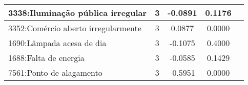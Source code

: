 \begin{table}[htbp]
\begin{tabular}{|l|c|c|c|c|}
		\hline
		3338:Iluminação pública irregular       & 3                & -0.0891        & 0.1176           \\
		\hline
		3352:Comércio aberto irregularmente     & 3                & 0.0877         & 0.0000           \\
		\hline
		1690:Lâmpada acesa de dia               & 3                & -0.1075        & 0.4000           \\
		\hline
		1688:Falta de energia                   & 3                & -0.0585        & 0.1429           \\
		\hline
		7561:Ponto de alagamento                & 3                & -0.5951        & 0.0000           \\
		\hline
	\end{tabular}
\end{table}

